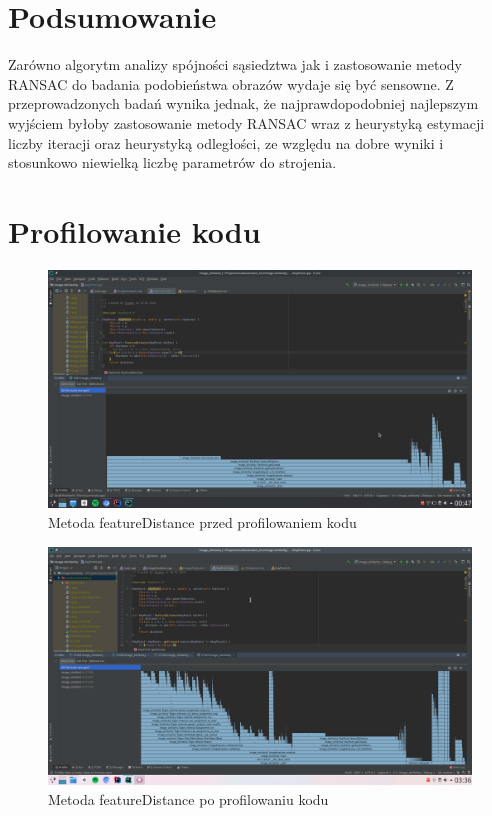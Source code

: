 \documentclass{article}
\begin{document}
	\section{Podsumowanie}
	Zarówno algorytm analizy spójności sąsiedztwa jak i zastosowanie metody RANSAC do badania podobieństwa obrazów wydaje się być sensowne. Z przeprowadzonych badań wynika jednak, że najprawdopodobniej najlepszym wyjściem byłoby zastosowanie metody RANSAC wraz z heurystyką estymacji liczby iteracji oraz heurystyką odległości, ze względu na dobre wyniki i stosunkowo niewielką liczbę parametrów do strojenia.
	\section{Profilowanie kodu}
	\begin{figure}[H]
		\centering
		\includegraphics[width=\linewidth]{before.png}
		\caption{Metoda featureDistance przed profilowaniem kodu}
		\label{fig:before1}
	\end{figure}
	\begin{figure}[H]
		\centering
		\includegraphics[width=\linewidth]{after1.png}
		\caption{Metoda featureDistance po profilowaniu kodu}
		\label{fig:after1}
	\end{figure}
\end{document}
